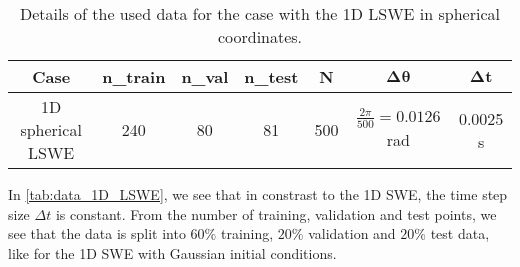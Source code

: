 \begin{table}[H]
    \centering
    \begin{tabular}{c|cccccc}
        \textbf{Case} & \textbf{n\_train} & \textbf{n\_val} & \textbf{n\_test} & \textbf{N} & $\mathbf{\Delta \theta}$ & $\mathbf{\Delta t}$ \\
        \hline
        1D spherical LSWE & 240 & 80 & 81 & 500 & $\frac{2 \pi}{500} = 0.0126$ rad  & 0.0025 s \\
    \end{tabular}
    \caption{Details of the used data for the case with the 1D LSWE in spherical coordinates.}\label{tab:data_1D_LSWE}
\end{table}
In \autoref{tab:data_1D_LSWE}, we see that in constrast to the 1D SWE, the time step size $\Delta t$ is constant.
From the number of training, validation and test points, we see that the data is split into $60\%$ training, $20\%$ validation and $20\%$ test data, like for the 1D SWE with Gaussian initial conditions.

